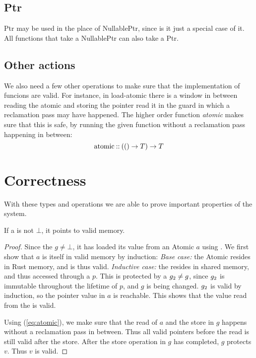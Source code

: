 \subsection{Ptr}

Ptr may be used in the place of NullablePtr, since is it just a special case of it. All functions
that take a NullablePtr can also take a Ptr.


\subsection{Other actions}

We also need a few other operations to make sure that the implementation of funcions are valid.
For instance, in load-atomic there is a window in between reading the atomic and storing the
pointer read it in the guard in which a reclamation pass may have happened. The higher order
function \emph{atomic} makes sure that this is safe, by running the given function without a
reclamation pass happening in between:
\begin{equation}\label{eq:atomic}
  \text{atomic\:::\:} (() \to T) \to T
\end{equation}


\section{Correctness}

With these types and operations we are able to prove important properties of the system.

\begin{theorem}\label{thm:guard-valid}
  If a  is not $\bot$, it points to valid memory.
\end{theorem}
\begin{proof}
  Since the  $g \neq \bot$, it has loaded its value from an Atomic $a$ using
  .  We first show that $a$ is itself in valid memory by induction: \emph{Base
  case:} the Atomic resides in Rust memory, and is thus valid. \emph{Inductive case:} the
   resides in shared memory, and thus accessed through a  $p$.  This  is
  protected by a  $g\sb{2} \neq g$, since $g\sb{2}$ is immutable throughout the lifetime
  of $p$, and $g$ is being changed. $g\sb{2}$ is valid by induction, so the pointer value in $a$ is
  reachable. This shows that the value read from the  is valid.

  Using  (\cref{eq:atomic}), we make sure that the read of $a$ and the store in
  $g$ happens without a reclamation pass in between. Thus all valid pointers before the read is
  still valid after the store. After the store operation in $g$ has completed, $g$ protects $v$.
  Thus $v$ is valid.
\end{proof}

